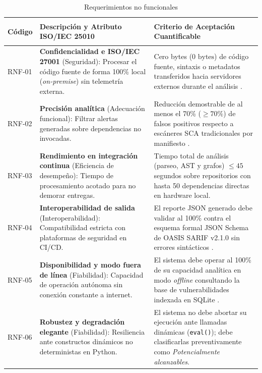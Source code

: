\begin{table}[H]
\centering
\caption{Requerimientos no funcionales}
\label{tab:req_nofuncionales}
\small
{}
\begin{tabularx}{\textwidth}{>{\bfseries\raggedright\arraybackslash}p{2.0cm} >{\raggedright\arraybackslash}p{5.8cm} X}
\toprule
\textbf{Código} & \textbf{Descripción y Atributo ISO/IEC 25010} & \textbf{Criterio de Aceptación Cuantificable} \\
\midrule
RNF-01 & \textbf{Confidencialidad e ISO/IEC 27001} \newline (Seguridad): Procesar el código fuente de forma 100\% local (\textit{on-premise}) sin telemetría externa. & Cero bytes ($0\text{ bytes}$) de código fuente, sintaxis o metadatos transferidos hacia servidores externos durante el análisis \parencite{ladisa2023sok}. \\ %
\addlinespace
RNF-02 & \textbf{Precisión analítica} \newline (Adecuación funcional): Filtrar alertas generadas sobre dependencias no invocadas. & Reducción demostrable de al menos el 70\% ($\ge 70\%$) de falsos positivos respecto a escáneres SCA tradicionales por manifiesto \parencite{pashchenko2022vuln4real}. \\ %
\addlinespace
RNF-03 & \textbf{Rendimiento en integración continua} \newline (Eficiencia de desempeño): Tiempo de procesamiento acotado para no demorar entregas. & Tiempo total de análisis (parseo, AST y grafos) $\le 45$ segundos sobre repositorios con hasta 50 dependencias directas en hardware local. \\ %
\addlinespace
RNF-04 & \textbf{Interoperabilidad de salida} \newline (Interoperabilidad): Compatibilidad estricta con plataformas de seguridad en CI/CD. & El reporte JSON generado debe validar al 100\% contra el esquema formal JSON Schema de OASIS SARIF v2.1.0 sin errores sintácticos \parencite{oasis2019sarif}. \\ %
\addlinespace
RNF-05 & \textbf{Disponibilidad y modo fuera de línea} \newline (Fiabilidad): Capacidad de operación autónoma sin conexión constante a internet. & El sistema debe operar al 100\% de su capacidad analítica en modo \textit{offline} consultando la base de vulnerabilidades indexada en SQLite \parencite{openssf2023osv}. \\ %
\addlinespace
RNF-06 & \textbf{Robustez y degradación elegante} \newline (Fiabilidad): Resiliencia ante constructos dinámicos no deterministas en Python. & El sistema no debe abortar su ejecución ante llamadas dinámicas (\texttt{eval()}); debe clasificarlas preventivamente como \textit{Potencialmente alcanzables}. \\ %

\end{tabularx}
\end{table}
